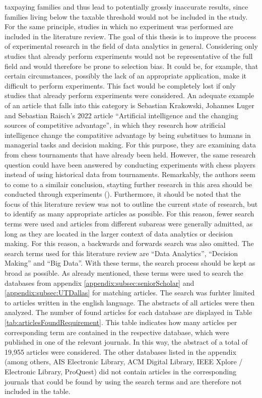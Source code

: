taxpaying families and thus lead to potentially grossly inaccurate results, since families living below the taxable threshold would not be included in the study. For the same principle, studies in which no experiment was performed are included in the literature review. The goal of this thesis is to improve the process of experimental research in the field of data analytics in general. Considering only studies that already perform experiments would not be representative of the full field and would therefore be prone to selection bias. It could be, for example, that certain circumstances, possibly the lack of an appropriate application, make it difficult to perform experiments. This fact would be completely lost if only studies that already perform experiments were considered. An adequate example of an article that falls into this category is Sebastian Krakowski, Johannes Luger and Sebastian Raisch's 2022 article \enquote{Artificial intelligence and the changing sources of competitive advantage}, in which they research how atrificial intelligence change the compatitive advantage by being substitues to humans in managerial tasks and decision making. For this purpose, they are examining data from chess tournaments that have already been held. However, the same research question could have been answered by conducting experiments with chess players instead of using historical data from tournaments. Remarkably, the authors seem to come to a similair conclusion, stayting further research in this area should be conducted through experiments (\cite{Krakowski.2022}). Furthermore, it should be noted that the focus of this literature review was not to outline the current state of research, but to identify as many appropriate articles as possible. For this reason, fewer search terms were used and articles from different subareas were generally admitted, as long as they are located in the larger context of data analytics or decision making. For this reason, a backwards and forwards search was also omitted.
The search terms used for this literature review are \enquote{Data Analytics}, \enquote{Decision Making} and \enquote{Big Data}. With these terms, the search process should be kept as broad as possible. As already mentioned, these terms were used to search the databases from appendix \ref{appendix:subsec:seniorScholar} and \ref{appendix:subsec:UTDallas} for matching articles. The search was furhter limited to articles written in the english language. The abstracts of all articles were then analyzed. The number of found articles for each database are displayed in Table \ref{tab:articlesFoundRequirement}. This table indicates how many articles per corresponding term are contained in the respective database, which were published in one of the relevant journals. In this way, the abstract of a total of 19,955 articles were considered. The other databases listed in the appendix (among others, AIS Electronic Library, ACM Digital Library, IEEE Xplore / Electronic Library, ProQuest) did not contain articles in the corresponding journals that could be found by using the search terms and are therefore not included in the table.

